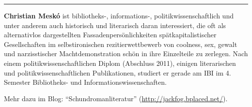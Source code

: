 \begin{center}\rule{0.5\linewidth}{\linethickness}\end{center}

\textbf{Christian Meskó} ist bibliotheks-, informations-,
politikwissenschaftlich und unter anderem auch historisch und
literarisch daran interessiert, die oft als alternativlos dargestellten
Fassadenpersönlichkeiten spätkapitalistischer Gesellschaften im
selbstironischen rezitierwettbewerb von coolness, sex, gewalt und
narzisstischer Machtdemonstration schön in ihre Einzelteile zu zerlegen.
Nach einem politikwissenschaftlichen Diplom (Abschluss 2011), einigen
literarischen und politikwissenschaftlichen Publikationen, studiert er
gerade am IBI im 4. Semester Bibliotheks- und
Informationswissenschaften.

Mehr dazu im Blog: \enquote{Schundromanliteratur}
(\url{http://jackfog.bplaced.net/}).
